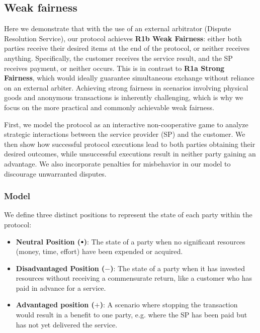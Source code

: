 \documentclass[pdftex,twocolumn,epjc3]{svjour3}
\newcommand{\plus}{+}
\newcommand{\minus}{-}
\newcommand\neutral[1][.75]{\mathbin{\ThisStyle{\vcenter{\hbox{%
  \scalebox{#1}{$\SavedStyle\bullet$}}}}}%
}
\begin{document}
\subsection{Weak fairness}
Here we demonstrate that with the use of an external arbitrator (Dispute Resolution Service), our protocol achieves \textbf{R1b Weak Fairness}: either both parties receive their desired items at the end of the protocol, or neither receives anything. Specifically, the customer receives the service result, and the SP receives payment, or neither occurs. This is in contrast to \textbf{R1a Strong Fairness}, which would ideally guarantee simultaneous exchange without reliance on an external arbiter.  Achieving strong fairness in scenarios involving physical goods and anonymous transactions is inherently challenging, which is why we focus on the more practical and commonly achievable weak fairness.

\begin{sloppypar}
First, we model the protocol as an interactive non-cooperative game to analyze strategic interactions between the service provider (SP) and the customer. We then show how successful protocol executions lead to both parties obtaining their desired outcomes, while unsuccessful executions result in neither party gaining an advantage. We also incorporate penalties for misbehavior in our model to discourage unwarranted disputes.
\end{sloppypar}

\subsubsection{Model}\label{sec:fairness-model}
We define three distinct positions to represent the state of each party within the protocol:


\begin{itemize}
\item \textbf{Neutral Position ($\neutral{}$)}: The state of a party when no significant resources (money, time, effort) have been expended or acquired.
\item \textbf{Disadvantaged Position ($\minus{}$)}: The state of a party when it has invested resources without receiving a commensurate return, like a customer who has paid in advance for a service.
\item \textbf{Advantaged position ($\plus{}$)}: A scenario where stopping the transaction would result in a benefit to one party, e.g. where the SP has been paid but has not yet delivered the service.
\end{itemize}
\end{document}
